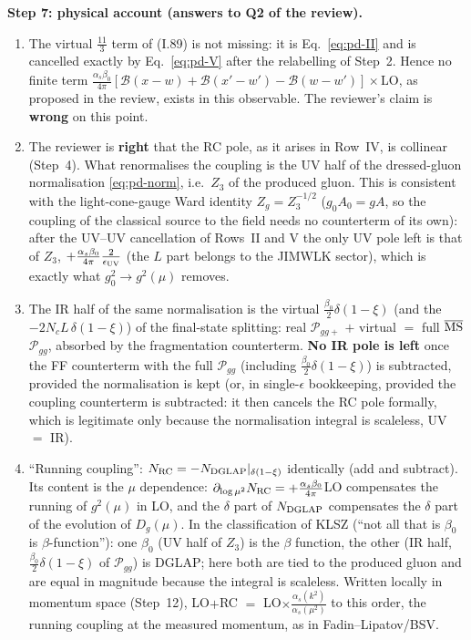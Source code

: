 \medskip
\noindent\textbf{Step 7: physical account (answers to Q2 of the review).}
\begin{enumerate}
\item The virtual $\frac{11}{3}$ term of (I.89) is not missing: it is Eq.~\eqref{eq:pd-II} and is cancelled exactly by Eq.~\eqref{eq:pd-V} after the relabelling of Step~2. Hence no finite term $\frac{\alpha_{s}\beta_{0}}{4\pi}[\mathcal{B}(x-w)+\mathcal{B}(x'-w')-\mathcal{B}(w-w')]\times$LO, as proposed in the review, exists in this observable. The reviewer's claim is \textbf{wrong} on this point.
\item The reviewer is \textbf{right} that the RC pole, as it arises in Row~IV, is collinear (Step~4). What renormalises the coupling is the UV half of the dressed-gluon normalisation \eqref{eq:pd-norm}, i.e.\ $Z_{3}$ of the produced gluon. This is consistent with the light-cone-gauge Ward identity $Z_{g}=Z_{3}^{-1/2}$ ($g_{0}A_{0}=gA$, so the coupling of the classical source to the field needs no counterterm of its own): after the UV--UV cancellation of Rows~II and V the only UV pole left is that of $Z_{3}$, $+\frac{\alpha_{s}\beta_{0}}{4\pi}\frac{2}{\epsilon_{\rm UV}}$ (the $L$ part belongs to the JIMWLK sector), which is exactly what $g_{0}^{2}\to g^{2}(\mu)$ removes.
\item The IR half of the same normalisation is the virtual $\frac{\beta_{0}}{2}\delta(1-\xi)$ (and the $-2N_{c}L\,\delta(1-\xi)$) of the final-state splitting: real $\mathcal{P}_{gg+}$ $+$ virtual $=$ full $\overline{\rm MS}$ $\mathcal{P}_{gg}$, absorbed by the fragmentation counterterm. \textbf{No IR pole is left} once the FF counterterm with the full $\mathcal{P}_{gg}$ (including $\frac{\beta_{0}}{2}\delta(1-\xi)$) is subtracted, provided the normalisation is kept (or, in single-$\epsilon$ bookkeeping, provided the coupling counterterm is subtracted: it then cancels the RC pole formally, which is legitimate only because the normalisation integral is scaleless, UV $=$ IR).
\item ``Running coupling'': $N_{\rm RC}=-N_{\rm DGLAP}|_{\delta(1-\xi)}$ identically (add and subtract). Its content is the $\mu$ dependence: $\partial_{\log\mu^{2}}N_{\rm RC}=+\frac{\alpha_{s}\beta_{0}}{4\pi}$LO compensates the running of $g^{2}(\mu)$ in LO, and the $\delta$ part of $N_{\rm DGLAP}$ compensates the $\delta$ part of the evolution of $D_{g}(\mu)$. In the classification of KLSZ (``not all that is $\beta_{0}$ is $\beta$-function''): one $\beta_{0}$ (UV half of $Z_{3}$) is the $\beta$ function, the other (IR half, $\frac{\beta_{0}}{2}\delta(1-\xi)$ of $\mathcal{P}_{gg}$) is DGLAP; here both are tied to the produced gluon and are equal in magnitude because the integral is scaleless. Written locally in momentum space (Step~12), LO$+$RC $=$ LO$\times\frac{\alpha_{s}(k^{2})}{\alpha_{s}(\mu^{2})}$ to this order, the running coupling at the measured momentum, as in Fadin--Lipatov/BSV.
\end{enumerate}

